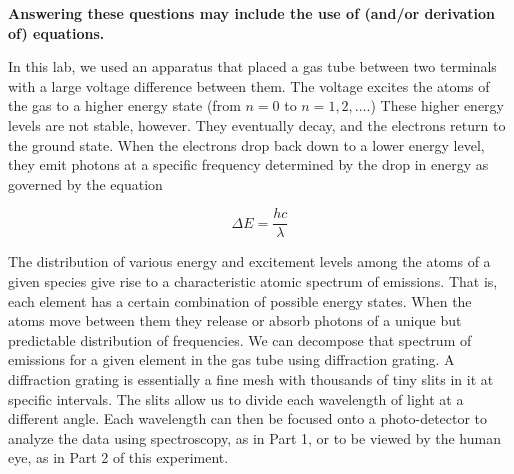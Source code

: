 \documentclass[prX,nofootinbib,notitlepage,12pt]{revtex4-1}
\begin{document}
\textbf{Answering these questions may include the use of (and/or derivation of) equations.}


In this lab, we used an apparatus that placed a gas tube between two terminals with a large voltage difference between them. The voltage excites the atoms of the gas to a higher energy state (from $n = 0$ to $n = 1, 2, \dots$.) These higher energy levels are not stable, however. They eventually decay, and the electrons return to the ground state. When the electrons drop back down to a lower energy level, they emit photons at a specific frequency determined by the drop in energy as governed by the equation

$$
    \Delta E = \frac{hc}{\lambda}
$$

The distribution of various energy and excitement levels among the atoms of a given species give rise to a characteristic atomic spectrum of emissions. That is, each element has a certain combination of possible energy states. When the atoms move between them they release or absorb photons of a unique but predictable distribution of frequencies. We can decompose that spectrum of emissions for a given element in the gas tube using diffraction grating. A diffraction grating is essentially a fine mesh with thousands of tiny slits in it at specific intervals. The slits allow us to divide each wavelength of light at a different angle. Each wavelength can then be focused onto a photo-detector to analyze the data using spectroscopy, as in Part 1, or to be viewed by the human eye, as in Part 2 of this experiment.
\end{document}
